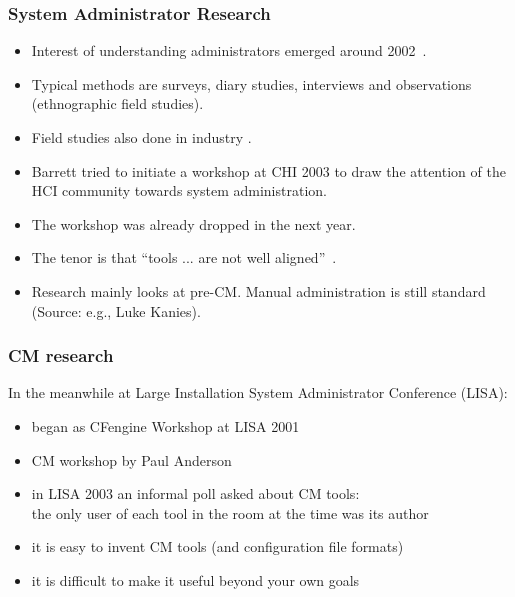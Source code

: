 \begin{frame}
	\frametitle{System Administrator Research}

	\begin{itemize}[<+-| alert@+>]
	\item Interest of understanding administrators emerged around 2002~\cite{anderson2002researching}.
	\item Typical methods are surveys, diary studies, interviews and observations (ethnographic field studies).
	\item Field studies also done in industry \cite{barrett2004field}.
	\item Barrett \cite{barrett2003system} tried to initiate a workshop at CHI 2003 to draw the attention of the HCI community towards system administration.
	\item The workshop was already dropped in the next year.
	\item The tenor is that ``tools ... are not well aligned''~\cite{haber2007design}.
	\item Research mainly looks at pre-CM. Manual administration is still standard (Source: e.g., Luke Kanies).
	\end{itemize}
\end{frame}


\begin{frame}
	\frametitle{CM research}

	In the meanwhile at Large Installation System Administrator Conference (LISA):

	\begin{itemize}[<+-| alert@+>]
	\item began as CFengine Workshop at LISA 2001
	\item CM workshop by Paul Anderson~\cite{anderson2002researching}
	\item in LISA 2003 an informal poll asked about CM tools: \\
	 	the only user of each tool in the room at the time was its author~\cite{burgess2006modeling}
	\item it is easy to invent CM tools (and configuration file formats)
	\item it is difficult to make it useful beyond your own goals
	\end{itemize}
\end{frame}

